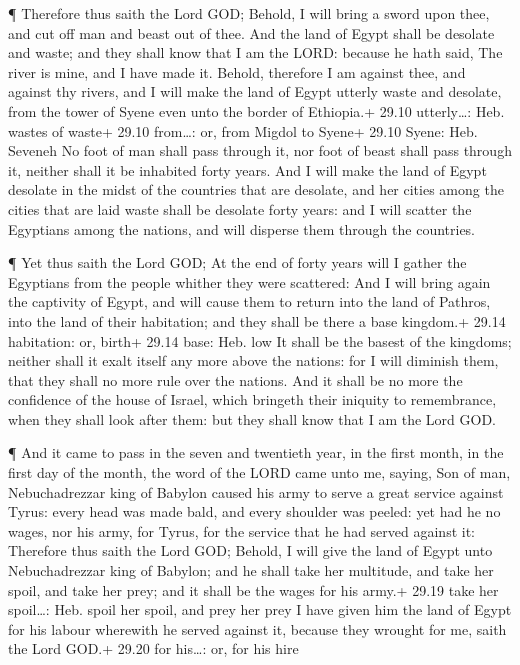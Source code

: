  ¶ Therefore thus saith the Lord GOD; Behold, I will bring a
sword upon thee, and cut off man and beast out of thee.  And
the land of Egypt shall be desolate and waste; and they shall know that
I am the LORD: because he hath said, The river is mine, and I have made
it.  Behold, therefore I am against thee, and against thy
rivers, and I will make the land of Egypt utterly waste and desolate,
from the tower of Syene even unto the border of Ethiopia.+ 29.10
utterly\ldots: Heb. wastes of waste+ 29.10 from\ldots: or, from Migdol
to Syene+ 29.10 Syene: Heb. Seveneh  No foot of man shall
pass through it, nor foot of beast shall pass through it, neither shall
it be inhabited forty years.  And I will make the land of
Egypt desolate in the midst of the countries that are desolate, and her
cities among the cities that are laid waste shall be desolate forty
years: and I will scatter the Egyptians among the nations, and will
disperse them through the countries.

 ¶ Yet thus saith the Lord GOD; At the end of forty years
will I gather the Egyptians from the people whither they were scattered:
 And I will bring again the captivity of Egypt, and will
cause them to return into the land of Pathros, into the land of their
habitation; and they shall be there a base kingdom.+ 29.14 habitation:
or, birth+ 29.14 base: Heb. low  It shall be the basest of
the kingdoms; neither shall it exalt itself any more above the nations:
for I will diminish them, that they shall no more rule over the nations.
 And it shall be no more the confidence of the house of
Israel, which bringeth their iniquity to remembrance, when they shall
look after them: but they shall know that I am the Lord GOD.

 ¶ And it came to pass in the seven and twentieth year, in
the first month, in the first day of the month, the word of the LORD
came unto me, saying,  Son of man, Nebuchadrezzar king of
Babylon caused his army to serve a great service against Tyrus: every
head was made bald, and every shoulder was peeled: yet had he no wages,
nor his army, for Tyrus, for the service that he had served against it:
 Therefore thus saith the Lord GOD; Behold, I will give the
land of Egypt unto Nebuchadrezzar king of Babylon; and he shall take her
multitude, and take her spoil, and take her prey; and it shall be the
wages for his army.+ 29.19 take her spoil\ldots: Heb. spoil her spoil,
and prey her prey  I have given him the land of Egypt for
his labour wherewith he served against it, because they wrought for me,
saith the Lord GOD.+ 29.20 for his\ldots: or, for his hire

